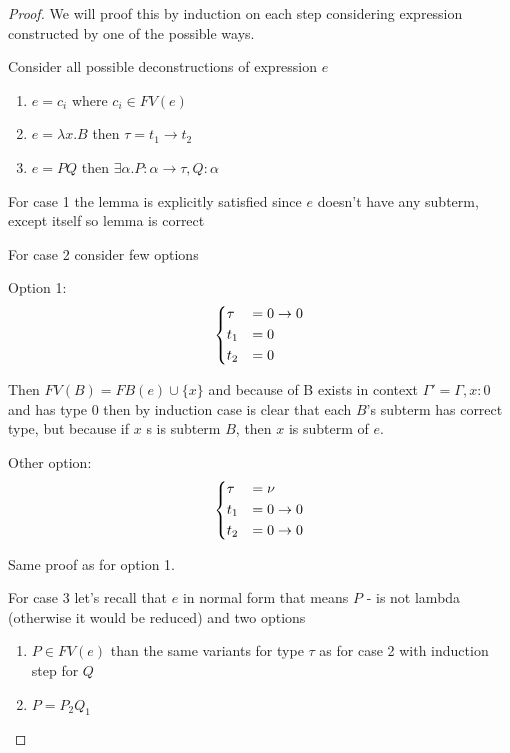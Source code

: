 \documentclass[11pt]{article}
\newcommand{\ga}{\alpha}
\newcommand{\gl}{\lambda}
\newcommand{\too}{\rightarrow}
\begin{document}
\begin{proof}
    
    We will proof this by induction on each step considering expression constructed by one of the possible ways.

    Consider all possible deconstructions of expression \(e\)

    \begin{enumerate}
        \item \(e = c_i\) where \(c_i \in FV(e)\)
        \item \(e = \gl x. B\) then \(\tau = t_1 \too t_2\)
        \item \(e = P Q\) then \(\exists \ga. P : \ga \too \tau, Q : \ga\)
    \end{enumerate}

    For case 1 the lemma is explicitly satisfied since \(e\) doesn't have any subterm, except itself so lemma is correct

    For case 2 consider few options
    
    Option 1:
    \begin{align*}
        \begin{dcases}
            \tau &= 0 \too 0 \\
            t_1 &= 0 \\
            t_2 &= 0
        \end{dcases}
    \end{align*}

    Then \(FV(B) = FB(e) \cup \{x\}\) and because of B exists in context \(\Gamma' = \Gamma, x:0\) and has type \(0\) then by induction case is clear that each \(B\)'s subterm has correct type, but because if \(x\) s is subterm \(B\), then \(x\) is subterm of \(e\).

    Other option:
    \begin{align*}
        \begin{dcases}
            \tau &= \nu \\
            t_1 &= 0 \too 0 \\
            t_2 &= 0 \too 0
        \end{dcases}
    \end{align*}

    Same proof as for option 1.

    For case 3 let's recall that \(e\) in normal form that means \(P\) - is not lambda (otherwise it would be reduced) and two options

    \begin{enumerate}
        \item \(P \in FV(e)\) than the same variants for type \(\tau\) as for case 2 with induction step for \(Q\)
        \item \(P = P_2 Q_1\)


\end{enumerate}
\end{proof}
\end{document}
